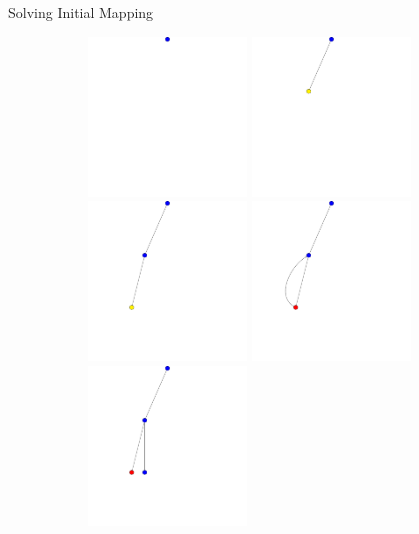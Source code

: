 \documentclass{beamer}
\begin{document}
\begin{frame}{Solving Initial Mapping}
\begin{figure}
\begin{subfigure}[b]{0.35\textwidth}
\begin{overprint}
		\end{overprint}
     \end{subfigure}
     \hfill %
     \begin{subfigure}[b]{0.6\textwidth}
		\begin{overprint}
		\centering
		\includegraphics[height=120pt]{figures/tree1}
		\onslide<5>\centering
		\includegraphics[height=120pt]{figures/tree2}
		\onslide<6>\centering
		\includegraphics[height=120pt]{figures/tree3}
		\onslide<7>\centering
		\includegraphics[height=120pt]{figures/tree4}
		\onslide<8>\centering
		\includegraphics[height=120pt]{figures/tree5}

\end{overprint}
\end{subfigure}
\end{figure}
\end{frame}
\end{document}
